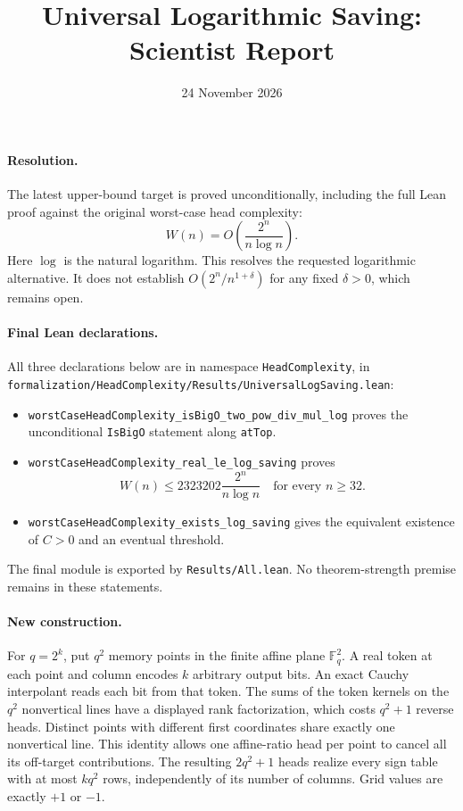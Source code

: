 \documentclass[11pt]{article}
\title{Universal Logarithmic Saving: Scientist Report}
\author{}
\date{24 November 2026}
\begin{document}
\maketitle

\paragraph{Resolution.}
The latest upper-bound target is proved unconditionally, including the full
Lean proof against the original worst-case head complexity:
\[
 W(n)=O\!\left(\frac{2^n}{n\log n}\right).
\]
Here $\log$ is the natural logarithm. This resolves the requested logarithmic
alternative. It does not establish $O(2^n/n^{1+\delta})$ for any fixed
$\delta>0$, which remains open.

\paragraph{Final Lean declarations.}
All three declarations below are in namespace \texttt{HeadComplexity}, in
\texttt{formalization/HeadComplexity/Results/UniversalLogSaving.lean}:
\begin{itemize}
\item \texttt{worstCaseHeadComplexity\_isBigO\_two\_pow\_div\_mul\_log}
proves the unconditional \texttt{IsBigO} statement along \texttt{atTop}.
\item \texttt{worstCaseHeadComplexity\_real\_le\_log\_saving}
proves
\[
 W(n)\le2323202\frac{2^n}{n\log n}\quad\text{for every }n\ge32.
\]
\item \texttt{worstCaseHeadComplexity\_exists\_log\_saving}
gives the equivalent existence of $C>0$ and an eventual threshold.
\end{itemize}
The final module is exported by \texttt{Results/All.lean}.
No theorem-strength premise remains in these statements.

\paragraph{New construction.}
For $q=2^k$, put $q^2$ memory points in the finite affine plane
$\mathbb F_q^2$. A real token at each point and column encodes $k$ arbitrary
output bits. An exact Cauchy interpolant reads each bit from that token.
The sums of the token kernels on the $q^2$ nonvertical lines have a displayed
rank factorization, which costs $q^2+1$ reverse heads. Distinct points with
different first coordinates share exactly one nonvertical line. This identity
allows one affine-ratio head per point to cancel all its off-target
contributions. The resulting $2q^2+1$ heads realize every sign table with at
most $kq^2$ rows, independently of its number of columns. Grid values are
exactly $+1$ or $-1$.
\end{document}
